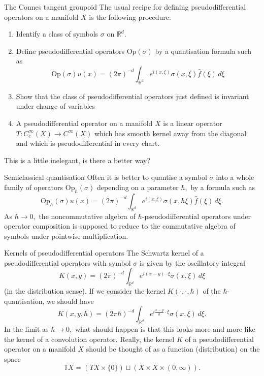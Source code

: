 \documentclass{beamer}
\numberwithin{equation}{section}
\theoremstyle{plain}
\theoremstyle{plain}
\theoremstyle{definition}
\theoremstyle{plain}
\theoremstyle{plain}
\theoremstyle{definition}
\newcommand{\Rl}{\mathbb{R}}
\newcommand{\Op}{\mathrm{Op}}
\begin{document}
\begin{frame}{The Connes tangent groupoid}
  The usual recipe for defining pseudodifferential operators on a manifold $X$ is the following procedure:
  \begin{enumerate}
      \item{} Identify a class of symbols $\sigma$ on $\Rl^d.$
      \item{} Define pseudodifferential operators $\Op(\sigma)$ by a quantisation formula such as
      \[
        \Op(\sigma)u(x) = (2\pi)^{-d} \int_{\Rl^d} e^{i(x,\xi)} \sigma(x,\xi)\widehat{f}(\xi)\,d\xi
      \]
      \item{} Show that the class of pseudodifferential operators just defined is invariant under change of variables
      \item{} A pseudodifferential operator on a manifold $X$ is a linear operator $T:C^\infty_c(X)\to C^\infty(X)$ which has smooth kernel away from the diagonal and which is pseudodifferential in every chart.
  \end{enumerate}
  This is a little inelegant, is there a better way?
\end{frame}

\begin{frame}{Semiclassical quantisation}
  Often it is better to quantise a symbol $\sigma$ into a whole family of operators $\Op_{\hbar}(\sigma)$ depending on a parameter $\hbar,$ by a formula such as
  \[
    \Op_{\hbar}(\sigma)u(x) = (2\pi)^{-d} \int_{\Rl^d} e^{i(x,\xi)}\sigma(x,\hbar \xi)\widehat{f}(\xi)\,d\xi.
  \]
  As $\hbar\to 0,$ the noncommutative algebra of $\hbar$-pseudodifferential operators under operator composition is supposed to reduce to the commutative algebra of symbols under pointwise multiplication.
\end{frame}


\begin{frame}{Kernels of pseudodifferential operators}
  The Schwartz kernel of a pseudodifferential operators with symbol $\sigma$ is given by the oscillatory integral
  \[
      K(x,y) = (2\pi)^{-d}\int_{\Rl^d} e^{i(x-y)\cdot \xi}\sigma(x,\xi)\,d\xi
  \]
  (in the distribution sense). If we consider the kernel $K(\cdot,\cdot,\hbar)$ of the $\hbar$-quantisation, we should have
  \[
      K(x,y,\hbar) = (2\pi \hbar)^{-d} \int_{\Rl^d} e^{i\frac{x-y}{\hbar}\cdot \xi}\sigma(x,\xi)\,d\xi.
  \]
  In the limit as $\hbar\to 0,$ what should happen is that this looks more and more like the kernel of a convolution operator.
  Really, the kernel $K$ of a pseudodifferential operator on a manifold $X$ should be thought of as a function (distribution) on the space
  \[
      \mathbb{T}X = (TX\times \{0\})\sqcup (X\times X\times (0,\infty)).
  \]
\end{frame}
\end{document}
